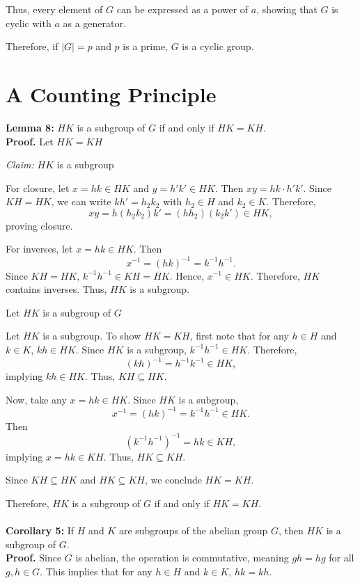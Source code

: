 Thus, every element of \( G \) can be expressed as a power of \( a \), showing that \( G \) is cyclic with \( a \) as a generator.

Therefore, if \( |G| = p \) and \( p \) is a prime, \( G \) is a cyclic group.

\section{A Counting Principle}
\textbf{Lemma 8:} \( HK \) is a subgroup of \( G \) if and only if \( HK = KH \).
\\
\textbf{Proof.}
Let \( HK = KH \)

\textit{Claim:} \( HK \) is a subgroup

For closure, let \( x = hk \in HK \) and \( y = h'k' \in HK \). Then \( xy = hk \cdot h'k' \). Since \( KH = HK \), we can write \( kh' = h_2k_2 \) with \( h_2 \in H \) and \( k_2 \in K \). Therefore,
\[ xy = h(h_2k_2)k' = (hh_2)(k_2k') \in HK, \]
proving closure.

For inverses, let \( x = hk \in HK \). Then 
\[ x^{-1} = (hk)^{-1} = k^{-1}h^{-1}. \]
Since \( KH = HK \), \( k^{-1}h^{-1} \in KH = HK \). Hence, \( x^{-1} \in HK \). Therefore, \( HK \) contains inverses.
Thus, \( HK \) is a subgroup.

Let \( HK \) is a subgroup of \( G \)

Let \( HK \) is a subgroup. To show \( HK = KH \), first note that for any \( h \in H \) and \( k \in K \), \( kh \in HK \). Since \( HK \) is a subgroup, \( k^{-1}h^{-1} \in HK \). Therefore,
\[ (kh)^{-1} = h^{-1}k^{-1} \in HK, \]
implying \( kh \in HK \). Thus, \( KH \subseteq HK \).

Now, take any \( x = hk \in HK \). Since \( HK \) is a subgroup,
\[ x^{-1} = (hk)^{-1} = k^{-1}h^{-1} \in HK. \]
Then
\[ (k^{-1}h^{-1})^{-1} = hk \in KH, \]
implying \( x = hk \in KH \). Thus, \( HK \subseteq KH \).

Since \( KH \subseteq HK \) and \( HK \subseteq KH \), we conclude \( HK = KH \).

Therefore, \( HK \) is a subgroup of \( G \) if and only if \( HK = KH \).
\\\\
\textbf{Corollary 5:} If \( H \) and \( K \) are subgroups of the abelian group \( G \), then \( HK \) is a subgroup of \( G \).
\\
\textbf{Proof.} Since \( G \) is abelian, the operation is commutative, meaning \( gh = hg \) for all \( g, h \in G \). This implies that for any \( h \in H \) and \( k \in K \), \( hk = kh \). 

